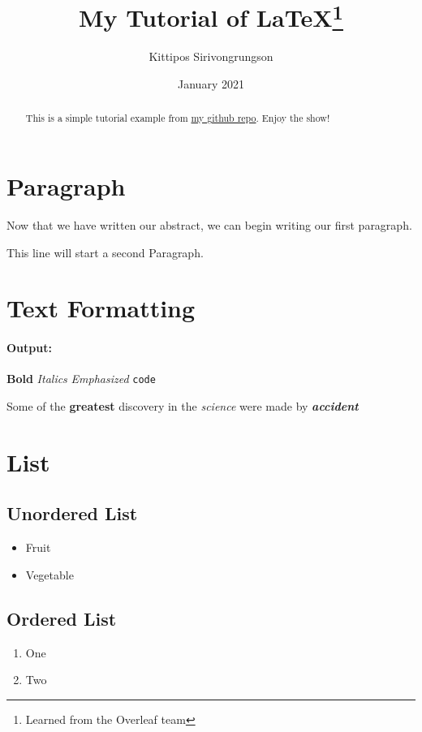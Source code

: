 \documentclass[12pt, letterpaper]{article}
\title{My Tutorial of \LaTeX \thanks{Learned from the Overleaf team}}
\author{Kittipos Sirivongrungson }
\date{January 2021}
\begin{document}
\maketitle

\begin{abstract}
    
    This is a simple tutorial example from \href{https://github.com/Lightbridge-KS/LaTeX-tutorial}{my github repo}.
    Enjoy the show!

\end{abstract}

\tableofcontents %

\newpage

\section{Paragraph}
Now that we have written our abstract, we can begin writing our first paragraph.
 
This line will start a second Paragraph.


\section{Text Formatting}

\paragraph{Output:}
\textbf{Bold} \textit{Italics} \emph{Emphasized} \texttt{code}

Some of the \textbf{greatest} discovery in the \textit{science} were made by \textbf{\textit{accident}}


\section{List}
\subsection{Unordered List}
\begin{itemize}
    \item Fruit
    \item Vegetable
\end{itemize}

\subsection{Ordered List}
\begin{enumerate}
    \item One
    \item Two
\end{enumerate}
\end{document}
